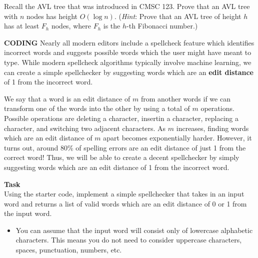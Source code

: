 \documentclass[addpoints,12pt,answers]{exam}
\begin{document}
\begin{questions}

\question[10]
Recall the AVL tree that was introduced in CMSC 123. Prove that an AVL tree with $n$ nodes has height $O(\log n)$. 
(\textit{Hint}: Prove that an AVL tree of height $h$ has at least $F_h$ nodes, where $F_h$ is the $h$-th Fibonacci number.)
\begin{solution}
\end{solution}

\question[30]
\textbf{CODING}
Nearly all modern editors include a spellcheck feature which identifies incorrect words and suggests possible words which the 
user might have meant to type. While modern spellcheck algorithms typically involve machine learning, we can create a simple 
spellchecker by suggesting words which are an \textbf{edit distance} of 1 from the incorrect word.

We say that a word is an edit distance of $m$ from another words if we can transform one of the words into the other by using
a total of $m$ operations. Possible operations are deleting a character, insertin a character, replacing a character, and 
switching two adjacent characters. As $m$ increases, finding words which are an edit distance of $m$ apart becomes 
exponentially harder. However, it turns out, around 80\% of spelling errors are an edit distance of just 1 from the correct word!
Thus, we will be able to create a decent spellchecker by simply suggesting words which are an edit distance of 1 from the incorrect 
word.

\textbf{Task}\\
Using the starter code, implement a simple spellchecker that takes in an input word and returns a list of valid words which are an 
edit distance of 0 or 1 from the input word.
\begin{itemize}
	\item You can assume that the input word will consist only of lowercase alphabetic characters. This means you do not need to consider
	uppercase characters, spaces, punctuation, numbers, etc.


\end{itemize}
\end{questions}
\end{document}
